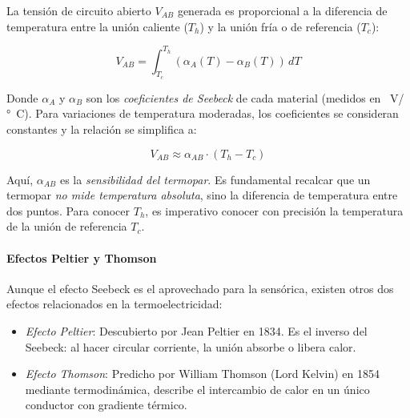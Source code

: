 La tensión de circuito abierto $V_{AB}$ generada es proporcional a la diferencia de temperatura entre la unión caliente ($T_h$) y la unión fría o de referencia ($T_c$):

\begin{equation}\label{eq:seebeck_integral}
    V_{AB} = \int_{T_c}^{T_h} (\alpha_A(T) - \alpha_B(T)) \, dT
\end{equation}

Donde $\alpha_A$ y $\alpha_B$ son los \emph{coeficientes de Seebeck} de cada material (medidos en \unit{\mu V/\degree C}). Para variaciones de temperatura moderadas, los coeficientes se consideran constantes y la relación se simplifica a:

\begin{equation}\label{eq:seebeck_lineal}
    V_{AB} \approx \alpha_{AB} \cdot (T_h - T_c)
\end{equation}

Aquí, $\alpha_{AB}$ es la \emph{sensibilidad del termopar}. Es fundamental recalcar que un termopar \emph{no mide temperatura absoluta}, sino la diferencia de temperatura entre dos puntos. Para conocer $T_h$, es imperativo conocer con precisión la temperatura de la unión de referencia $T_c$.

\paragraph{Efectos Peltier y Thomson}
Aunque el efecto Seebeck es el aprovechado para la sensórica, existen otros dos efectos relacionados en la termoelectricidad:
\begin{itemize}
    \item \emph{Efecto Peltier}: Descubierto por Jean Peltier en 1834. Es el inverso del Seebeck: al hacer circular corriente, la unión absorbe o libera calor.
    \item \emph{Efecto Thomson}: Predicho por William Thomson (Lord Kelvin) en 1854 mediante termodinámica, describe el intercambio de calor en un único conductor con gradiente térmico.
\end{itemize}



